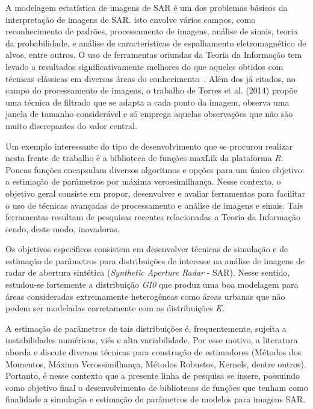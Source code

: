 \documentclass[12pt,letterpaper]{article}
\begin{document}
	A modelagem estatística de imagens de SAR é um dos problemas básicos da interpretação de imagens de SAR. isto envolve vários campos, como reconhecimento de padrões, processamento de imagens, análise de sinais, teoria da probabilidade,
e análise de características de espalhamento eletromagnético de alvos, entre outros\cite{Gao2010StatisticalMO}.
O uso de ferramentas oriundas da Teoria da Informação tem levado a resultados significativamente melhores do que aqueles obtidos com técnicas clássicas em diversas áreas do conhecimento~\cite{InformationTheory}. Além dos já citados, no campo do processamento de imagens, o trabalho de Torres et al. (2014) propõe uma técnica de filtrado que se adapta a cada ponto da imagem, observa uma janela de tamanho considerável e só emprega aquelas observações que não são muito discrepantes do valor central. 

Um exemplo interessante do tipo de desenvolvimento que se procurou realizar nesta frente de trabalho é a biblioteca de funções maxLik da plataforma \emph{R}. Poucas funções encapsulam diversos algoritmos e opções para um único objetivo: a estimação de parâmetros por máxima verossimilhança. Nesse contexto, o objetivo geral consiste em propor, desenvolver e avaliar ferramentas para facilitar o uso de técnicas avançadas de processamento e análise de imagens e sinais. Tais ferramentas resultam de pesquisas recentes relacionadas a Teoria da Informação sendo, deste modo, inovadoras.

Os objetivos específicos consistem em desenvolver técnicas de simulação e de estimação de parâmetros para distribuições de interesse na análise de imagens de radar de abertura sintética (\textit{Synthetic Aperture Radar} - SAR). Nesse sentido, estudou-se fortemente a distribuição \emph{GI0} que produz uma boa modelagem para áreas consideradas extremamente heterogêneas como áreas urbanas que não podem ser modeladas corretamente com as distribuições \emph{K}.

	A estimação de parâmetros de tais distribuições é, frequentemente, sujeita a instabilidades numéricas, viés e alta variabilidade. Por esse motivo, a literatura aborda e discute diversas técnicas para construção de estimadores (Métodos dos Momentos, Máxima Verossimilhança, Métodos Robustos, Kernels, dentre outros).
	Portanto, é nesse contexto que a presente linha de pesquisa se insere, possuindo como objetivo final o desenvolvimento de bibliotecas de funções que tenham como finalidade a simulação e estimação de parâmetros de modelos para imagens SAR.
\end{document}
